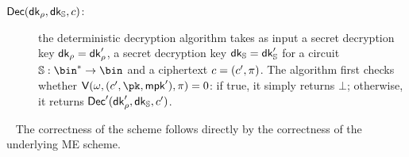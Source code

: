 \begin{construction}
\begin{description}
        \item[$\mathsf{Dec}(\mathsf{dk}_\rho, \mathsf{dk}_{\mathbb{S}}, c)$:] the deterministic decryption algorithm takes as input a secret decryption key $\mathsf{dk}_\rho = \mathsf{dk}'_\rho$, a secret decryption key $\mathsf{dk}_{\mathbb{S}} = \mathsf{dk}'_{\mathbb{S}}$ for a circuit $\saccess: \bin^* \to \bin$ and a ciphertext $c = (c', \pi)$. The algorithm first checks whether $\verifier(\crs, (\cipher', \pk, \mpk'), \pi) = 0$: if true, it simply returns $\bot$; otherwise, it returns $\mathsf{Dec}'(\mathsf{dk}'_\rho, \mathsf{dk}_{\mathbb{S}}, c')$.
    \end{description}
\end{construction}
~\newline
The correctness of the scheme follows directly by the correctness of the underlying ME scheme.
